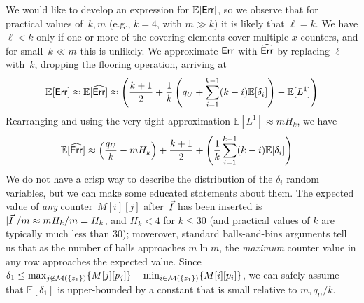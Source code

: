 We would like to develop an expression for $\mathbb{E}[\mathsf{Err}]$, so we observe that for practical values of~$k,m$ (e.g., $k=4$, with $m \gg k$) it is likely that $\ell=k$.  We have $\ell < k$ only if one or more of the covering elements cover multiple $x$-counters, and for small~$k \ll m$ this is unlikely.  We approximate $\mathsf{Err}$ with $\widehat{\mathsf{Err}}$ by replacing $\ell$ with~$k$, dropping the flooring operation, arriving at
\[
\mathbb{E}[\mathsf{Err}]\approx\mathbb{E}[\widehat{\mathsf{Err}}]
\approx \left( \frac{k+1}{2} + \frac{1}{k}\left(q_U + \sum_{i=1}^{k-1}(k-i)\mathbb{E}[\delta_i] \right) - \mathbb{E}[L^1] \right)
\]
Rearranging and using the very tight approximation $\mathbb{E}[L^1]\approx mH_k$, we have
\begin{align*}
	\mathbb{E}[\widehat{\mathsf{Err}}] &\approx \left( \frac{q_U}{k} - mH_k \right) + \frac{k+1}{2} + \left(\frac{1}{k}\sum_{i=1}^{k-1}(k-i) \mathbb{E}[\delta_i] \right) 
\end{align*}
We do not have a crisp way to describe the distribution of the $\delta_i$ random variables, but we can make some educated statements about them.  The expected value of \emph{any} counter~$M[i][j]$ after~$\vec{I}$ has been inserted is $|\vec{I}|/m \approx mH_k/m=H_k$, and $H_k < 4$ for $k \leq 30$ (and practical values of $k$ are typically much less than 30); moverover, standard balls-and-bins arguments tell us that as the number of balls approaches $m \ln m$, the \emph{maximum} counter value in any row approaches the expected value.  Since $\delta_1 \leq \max_{j \not\in \mathcal{M}(\{z_1\})}\{M[j][p_j]\} - \min_{i \in \mathcal{M}(\{z_1\})}\{M[i][p_i]\}$, we can safely assume that $\mathbb{E}\left[\delta_1\right]$ is upper-bounded by a constant that is small relative to $m, q_U/k$.  

